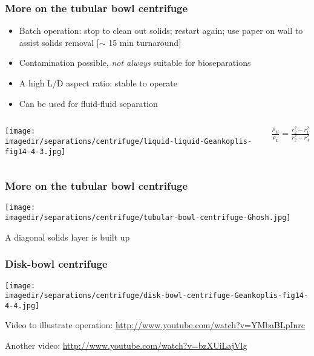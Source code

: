 \begin{frame}\frametitle{More on the tubular bowl centrifuge}
	\begin{itemize}	
		\item	Batch operation: stop to clean out solids; restart again; use paper on wall to assist solids removal [$\sim$ 15 min turnaround]
		\item	Contamination possible, \emph{not always} suitable for bioseparations
		\item	A high L/D aspect ratio: stable to operate
		\item	Can be used for fluid-fluid separation
	\end{itemize}	
	\begin{columns}[c]
			\begin{center}
				\texttt{[image: \\imagedir/separations/centrifuge/liquid-liquid-Geankoplis-fig14-4-3.jpg]}
			\end{center}
				$\displaystyle \frac{\rho_H}{\rho_L} = \displaystyle \frac{r_2^2 - r_1^2}{r_2^2 - r_4^2}$				
	\end{columns}
\end{frame}

\begin{frame}\frametitle{More on the tubular bowl centrifuge}
	\begin{center}
		\texttt{[image: \\imagedir/separations/centrifuge/tubular-bowl-centrifuge-Ghosh.jpg]}
	\end{center}
	A diagonal solids layer is built up
	
\end{frame}

\begin{frame}\frametitle{Disk-bowl centrifuge}
	\begin{center}
		\texttt{[image: \\imagedir/separations/centrifuge/disk-bowl-centrifuge-Geankoplis-fig14-4-4.jpg]}
	\end{center}
	
	\vspace{12pt}
	Video to illustrate operation: \href{http://www.youtube.com/watch?v=YMbaBLpInrc}{http://www.youtube.com/watch?v=YMbaBLpInrc}
	
	\vspace{2pt}
	{\tiny Another video: \href{http://www.youtube.com/watch?v=bzXUiLajVlg}{http://www.youtube.com/watch?v=bzXUiLajVlg}}

\end{frame}

